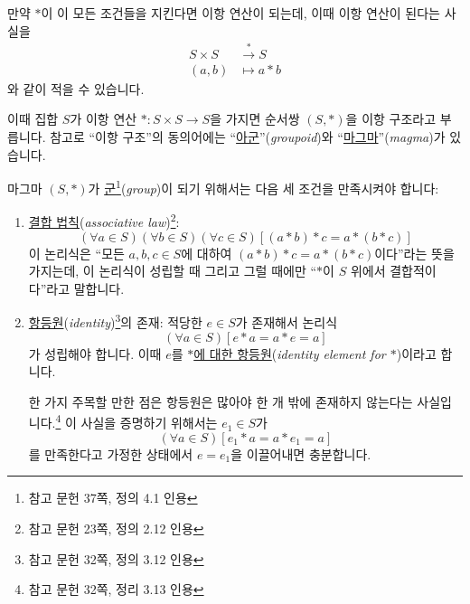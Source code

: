 \documentclass[12pt]{paper}
\begin{document}
  만약 $*$이 이 모든 조건들을 지킨다면 이항 연산이 되는데, 이때 이항 연산이 된다는 사실을
  \begin{align*}
    S \times S & \xrightarrow{*} S \\
    \left( a , b \right) & \mapsto a * b
  \end{align*}
  와 같이 적을 수 있습니다.

  이때 집합 $S$가 이항 연산 $* : S \times S \to S$을 가지면 순서쌍 $\left( S , * \right)$을 이항 구조라고 부릅니다.
  참고로 ``이항 구조''의 동의어에는 ``\underline{아군}''(\textit{groupoid})와 ``\underline{마그마}''(\textit{magma})가 있습니다.

  마그마 $ \left( S , * \right) $가 \underline{군}\footnote{참고 문헌 \cite{fraleigh2009} 37쪽, 정의 4.1 인용}(\textit{group})이 되기 위해서는 다음 세 조건을 만족시켜야 합니다:
  \begin{enumerate}
    \item \underline{결합 법칙}(\textit{associative law})\footnote{참고 문헌 \cite{fraleigh2009} 23쪽, 정의 2.12 인용}:
    \begin{equation*}
      \left( \forall a \in S \right) \left( \forall b \in S \right) \left( \forall c \in S \right) \left[ \left( a * b \right) * c = a * \left( b * c \right) \right] \tag{1}
    \end{equation*}
    이 논리식은 ``모든 $a , b , c \in S$에 대하여 $\left( a * b \right) * c = a * \left( b * c \right)$이다''라는 뜻을 가지는데,
    이 논리식이 성립할 때 그리고 그럴 때에만 ``$*$이 $S$ 위에서 결합적이다''라고 말합니다.

    \item \underline{항등원}(\textit{identity})\footnote{참고 문헌 \cite{fraleigh2009} 32쪽, 정의 3.12 인용}의 존재:
    적당한 $e \in S$가 존재해서 논리식
    \begin{equation*}
      \left( \forall a \in S \right) \left[ e * a = a * e = a \right] \tag{2}
    \end{equation*}
    가 성립해야 합니다.
    이때 $e$를 \underline{$*$에 대한 항등원}(\textit{identity element for $*$})이라고 합니다.
    
    한 가지 주목할 만한 점은 항등원은 많아야 한 개 밖에 존재하지 않는다는 사실입니다.\footnote{참고 문헌 \cite{fraleigh2009} 32쪽, 정리 3.13 인용}
    이 사실을 증명하기 위해서는 $e_1 \in S$가 
    \begin{equation*}
      \left( \forall a \in S \right) \left[ e_1 * a = a * e_1 = a \right] \tag{2-1}
    \end{equation*}
    를 만족한다고 가정한 상태에서 $e = e_1$을 이끌어내면 충분합니다.
    

\end{enumerate}
\end{document}

